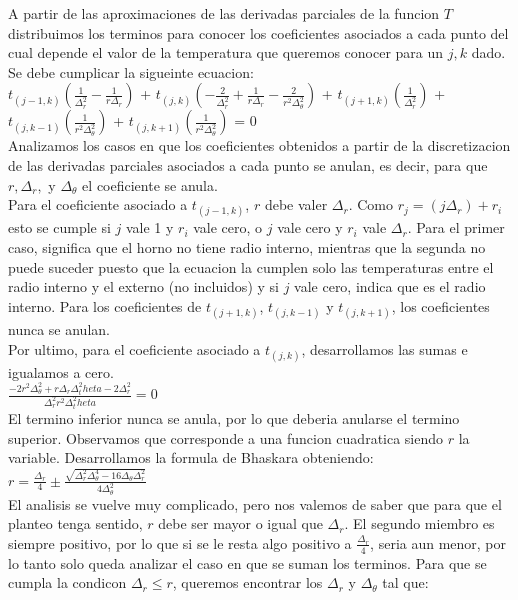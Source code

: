 \documentclass{article}
\begin{document}
A partir de las aproximaciones de las derivadas parciales de la funcion $T$ distribuimos los terminos para conocer los coeficientes asociados a cada punto del cual depende el valor de la temperatura que queremos conocer para un $j,k$ dado. Se debe cumplicar la sigueinte ecuacion: \\
$t_{(j-1, k)} (\frac{1}{\Delta^2_r}-\frac{1}{r \Delta_r})$ +
$t_{(j, k)} (-\frac{2}{\Delta^2_r}+\frac{1}{r \Delta_r}-\frac{2}{r^2 \Delta^2_\theta})$ + 
$t_{(j+1, k)} (\frac{1}{\Delta^2_r})$ + \\
$t_{(j, k-1)} (\frac{1}{r^2 \Delta^2_\theta})$ +
$t_{(j, k+1)} (\frac{1}{r^2 \Delta^2_\theta})$ = 0 \\

Analizamos los casos en que los coeficientes obtenidos a partir de la discretizacion de las derivadas parciales asociados a cada punto se anulan, es decir, para que $r, \Delta_r,$ y $\Delta_\theta$ el coeficiente se anula. \\
Para el coeficiente asociado a $t_{(j-1, k)}$, $r$ debe valer $\Delta_r$. Como $r_j = (j \Delta_r) + r_i$ esto se cumple si $j$ vale 1 y $r_i$ vale cero, o $j$ vale cero y $r_i$ vale $\Delta_r$. Para el primer caso, significa que el horno no tiene radio interno, mientras que la segunda no puede suceder puesto que la ecuacion la cumplen solo las temperaturas entre el radio interno y el externo (no incluidos) y si $j$ vale cero, indica que es el radio interno.
Para los coeficientes de $t_{(j+1, k)}$, $t_{(j, k-1)}$ y $t_{(j, k+1)}$, los coeficientes nunca se anulan. \\
Por ultimo, para el coeficiente asociado a $t_{(j, k)}$, desarrollamos las sumas e igualamos a cero. \\
$\frac{-2r^2 \Delta^2_\theta + r \Delta_r \Delta^2_theta - 2 \Delta^2_r}{\Delta^2_r r^2 \Delta^2_theta} = 0$\\
El termino inferior nunca se anula, por lo que deberia anularse el termino superior. Observamos que corresponde a una funcion cuadratica siendo $r$ la variable. Desarrollamos la formula de Bhaskara obteniendo: \\
$r = \frac{\Delta_r}{4} \pm \frac{\sqrt{\Delta^2_r \Delta^4_\theta - 16 \Delta_\theta \Delta^2_r}}{4 \Delta^2_\theta}$ \\
El analisis se vuelve muy complicado, pero nos valemos de saber que para que el planteo tenga sentido, $r$ debe ser mayor o igual que $\Delta_r$.
El segundo miembro es siempre positivo, por lo que si se le resta algo positivo a $\frac{\Delta_r}{4}$, seria aun menor, por lo tanto solo queda analizar el caso en que se suman los terminos. Para que se cumpla la condicon $\Delta_r \leq r$, queremos encontrar los $\Delta_r$ y $\Delta_\theta$ tal que: \\
\end{document}
